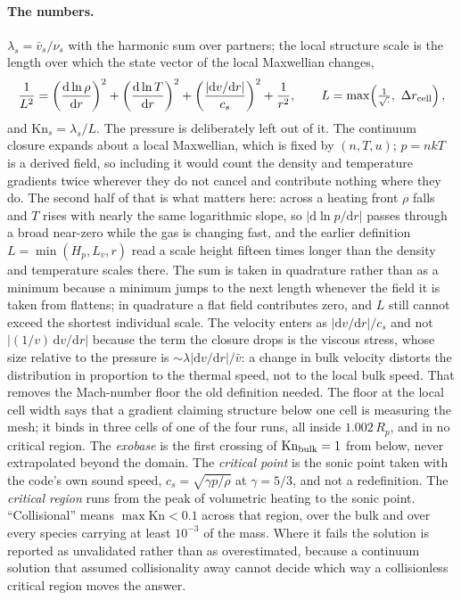 \documentclass[english,a4paper]{my_memo}
\begin{document}
\paragraph{The numbers.} $\lambda_s = \bar v_s/\nu_s$ with the harmonic sum
over partners; the local structure scale is the length over which the state
vector of the local Maxwellian changes,
\begin{equation}
  \frac{1}{L^{2}} = \left(\frac{\mathrm{d}\ln\rho}{\mathrm{d}r}\right)^{2}
  + \left(\frac{\mathrm{d}\ln T}{\mathrm{d}r}\right)^{2}
  + \left(\frac{|\mathrm{d}v/\mathrm{d}r|}{c_s}\right)^{2}
  + \frac{1}{r^{2}},
  \qquad L = \max\!\left(\textstyle\frac{1}{\sqrt{\cdot}},\ \Delta r_{\rm cell}\right),
\end{equation}
and $\mathrm{Kn}_s = \lambda_s/L$. The pressure is deliberately left out of
it. The continuum closure expands about a local Maxwellian, which is fixed by
$(n, T, u)$; $p = nkT$ is a derived field, so including it would count the
density and temperature gradients twice wherever they do not cancel and
contribute nothing where they do. The second half of that is what matters
here: across a heating front $\rho$ falls and $T$ rises with nearly the same
logarithmic slope, so $|\mathrm{d}\ln p/\mathrm{d}r|$ passes through a broad
near-zero while the gas is changing fast, and the earlier definition
$L = \min(H_p, L_v, r)$ read a scale height fifteen times longer than the
density and temperature scales there. The sum is taken in quadrature rather
than as a minimum because a minimum jumps to the next length whenever the
field it is taken from flattens; in quadrature a flat field contributes zero,
and $L$ still cannot exceed the shortest individual scale. The velocity
enters as $|\mathrm{d}v/\mathrm{d}r|/c_s$ and not
$|(1/v)\,\mathrm{d}v/\mathrm{d}r|$ because the term the closure drops is the
viscous stress, whose size relative to the pressure is
$\sim\lambda|\mathrm{d}v/\mathrm{d}r|/\bar v$: a change in bulk velocity
distorts the distribution in proportion to the thermal speed, not to the
local bulk speed. That removes the Mach-number floor the old definition
needed. The floor at the local cell width says that a gradient claiming
structure below one cell is measuring the mesh; it binds in three cells of
one of the four runs, all inside $1.002\,R_p$, and in no critical region. The
\emph{exobase} is the first crossing of $\mathrm{Kn}_{\rm bulk} = 1$ from
below, never extrapolated beyond the domain. The \emph{critical point} is the
sonic point taken with the code's own sound speed,
$c_s = \sqrt{\gamma p/\rho}$ at $\gamma = 5/3$, and not a redefinition. The
\emph{critical region} runs from the peak of volumetric heating to the sonic
point. ``Collisional'' means $\max \mathrm{Kn} < 0.1$ across that region,
over the bulk and over every species carrying at least $10^{-3}$ of the mass.
Where it fails the solution is reported as unvalidated rather than as
overestimated, because a continuum solution that assumed collisionality away
cannot decide which way a collisionless critical region moves the answer.
\end{document}
